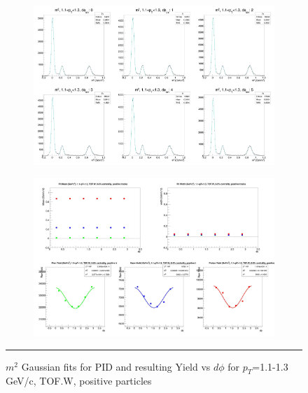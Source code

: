 \begin{figure}[H]
  \centering
    \begin{subfigure}[p]{1\textwidth}
    \includegraphics[width=1\textwidth]{lowptfits/yieldvsdphi_tof1_cent0_ch1_pT-11-13.jpg}
    \end{subfigure}
    \begin{subfigure}[p]{1\textwidth}
    \includegraphics[width=1\textwidth]{lowptfits/fitParams_tof1_cent0_ch1_pT-11-13.jpg}
    \end{subfigure}
    \rule{35em}{0.5pt}
  \caption[PID fits and Yield vs $d\phi$ for $p_T$=1.1-1.3 GeV/c, TOF.W, positive particles ]{$m^2$ Gaussian fits for PID and resulting Yield vs $d\phi$ for $p_T$=1.1-1.3 GeV/c, TOF.W, positive particles}
  \label{fig:fits11-13pos}
\end{figure}


